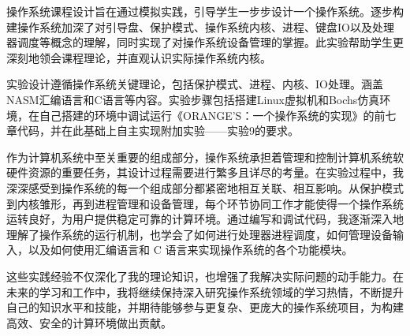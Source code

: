 \begin{cnabstract}
\thispagestyle{empty}

操作系统课程设计旨在通过模拟实践，引导学生一步步设计一个操作系统。逐步构建操作系统加深了对引导盘、保护模式、操作系统内核、进程、键盘IO以及处理器调度等概念的理解，同时实现了对操作系统设备管理的掌握。此实验帮助学生更深刻地领会课程理论，并直观认识实际操作系统内核。\par
实验设计遵循操作系统关键理论，包括保护模式、进程、内核、IO处理。涵盖NASM汇编语言和C语言等内容。实验步骤包括搭建Linux虚拟机和Bochs仿真环境，在自己搭建的环境中调试运行《ORANGE'S：一个操作系统的实现》的前七章代码，并在此基础上自主实现附加实验——实验9的要求。\par
作为计算机系统中至关重要的组成部分，操作系统承担着管理和控制计算机系统软硬件资源的重要任务，其设计过程需要进行繁多且详尽的考量。在实验过程中，我深深感受到操作系统的每一个组成部分都紧密地相互关联、相互影响。从保护模式到内核雏形，再到进程管理和设备管理，每个环节协同工作才能使得一个操作系统运转良好，为用户提供稳定可靠的计算环境。通过编写和调试代码，我逐渐深入地理解了操作系统的运行机制，也学会了如何进行处理器进程调度，如何管理设备输入，以及如何使用汇编语言和 C 语言来实现操作系统的各个功能模块。\par
这些实践经验不仅深化了我的理论知识，也增强了我解决实际问题的动手能力。在未来的学习和工作中，我将继续保持深入研究操作系统领域的学习热情，不断提升自己的知识水平和技能，并期待能够参与更复杂、更庞大的操作系统项目，为构建高效、安全的计算环境做出贡献。


\end{cnabstract}
\par
\vspace*{2em}





